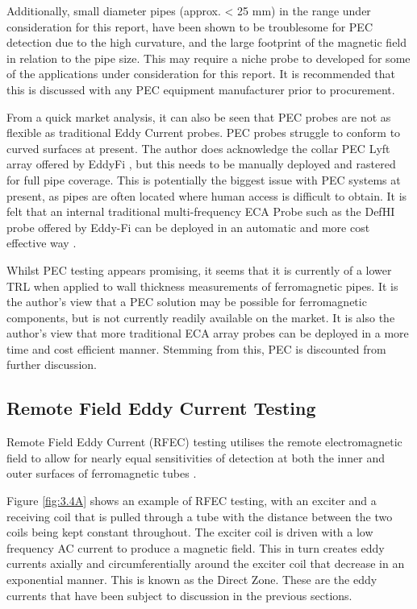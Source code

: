 \documentclass[a4paper,twoside,11pt]{article}
\begin{document}
Additionally, small diameter pipes (approx. < 25 mm) in the range under consideration for this report, have been shown to be troublesome for PEC detection \cite{eddyfiUsingPulsedEddy2019} due to the high curvature, and the large footprint of the magnetic field in relation to the pipe size. 
This may require a niche probe to developed for some of the applications under consideration for this report. 
It is recommended that this is discussed with any PEC equipment manufacturer prior to procurement.

From a quick market analysis, it can also be seen that PEC probes are not as flexible as traditional Eddy Current probes. PEC probes struggle to conform to curved surfaces at present. 
The author does acknowledge the collar PEC Lyft array offered by EddyFi \cite{eddyfiPulsedEddyCurrent2019}, but this needs to be manually deployed and rastered for full pipe coverage. 
This is potentially the biggest issue with PEC systems at present, as pipes are often located where human access is difficult to obtain.
It is felt that an internal traditional multi-frequency ECA Probe such as the DefHI probe offered by Eddy-Fi can be deployed in an automatic and more cost effective way \cite{eddyfiECADefHiProbe2019} \cite{eddyfiECATechnologyDefHi2019}.

Whilst PEC testing appears promising, it seems that it is currently of a lower TRL when applied to wall thickness measurements of ferromagnetic pipes. 
It is the author's view that a PEC solution may be possible for ferromagnetic components, but is not currently readily available on the market. It is also the author's view that more traditional ECA array probes can be deployed in a more time and cost efficient manner. 
Stemming from this, PEC is discounted from further discussion. 

\newpage

\subsection{Remote Field Eddy Current Testing}
Remote Field Eddy Current (RFEC) testing utilises the remote electromagnetic field to allow for nearly equal sensitivities of detection at both the inner and outer surfaces of ferromagnetic tubes \cite{nde-edRFTIntro}. 

Figure \ref{fig:3.4A} shows an example of RFEC testing, with an exciter and a receiving coil that is pulled through a tube with the distance between the two coils being kept constant throughout. 
The exciter coil is driven with a low frequency AC current to produce a magnetic field. 
This in turn creates eddy currents axially and circumferentially around the exciter coil that decrease in an exponential manner. 
This is known as the Direct Zone.
These are the eddy currents that have been subject to discussion in the previous sections.
\end{document}
